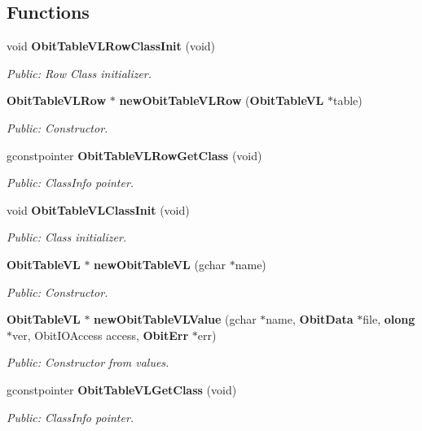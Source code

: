 \subsection*{Functions}
\begin{CompactItemize}
\item 
void {\bf Obit\-Table\-VLRow\-Class\-Init} (void)
\begin{CompactList}\small\item\em Public: Row Class initializer. \item\end{CompactList}\item 
{\bf Obit\-Table\-VLRow} $\ast$ {\bf new\-Obit\-Table\-VLRow} ({\bf Obit\-Table\-VL} $\ast$table)
\begin{CompactList}\small\item\em Public: Constructor. \item\end{CompactList}\item 
gconstpointer {\bf Obit\-Table\-VLRow\-Get\-Class} (void)
\begin{CompactList}\small\item\em Public: Class\-Info pointer. \item\end{CompactList}\item 
void {\bf Obit\-Table\-VLClass\-Init} (void)
\begin{CompactList}\small\item\em Public: Class initializer. \item\end{CompactList}\item 
{\bf Obit\-Table\-VL} $\ast$ {\bf new\-Obit\-Table\-VL} (gchar $\ast$name)
\begin{CompactList}\small\item\em Public: Constructor. \item\end{CompactList}\item 
{\bf Obit\-Table\-VL} $\ast$ {\bf new\-Obit\-Table\-VLValue} (gchar $\ast$name, {\bf Obit\-Data} $\ast$file, {\bf olong} $\ast$ver, Obit\-IOAccess access, {\bf Obit\-Err} $\ast$err)
\begin{CompactList}\small\item\em Public: Constructor from values. \item\end{CompactList}\item 
gconstpointer {\bf Obit\-Table\-VLGet\-Class} (void)
\begin{CompactList}\small\item\em Public: Class\-Info pointer. \item\end{CompactList}\item 

\end{CompactItemize}
